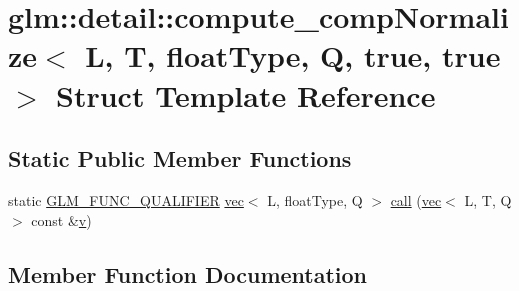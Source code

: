 \hypertarget{structglm_1_1detail_1_1compute__comp_normalize_3_01_l_00_01_t_00_01float_type_00_01_q_00_01true_00_01true_01_4}{}\section{glm\+:\+:detail\+:\+:compute\+\_\+comp\+Normalize$<$ L, T, float\+Type, Q, true, true $>$ Struct Template Reference}
\label{structglm_1_1detail_1_1compute__comp_normalize_3_01_l_00_01_t_00_01float_type_00_01_q_00_01true_00_01true_01_4}
\subsection*{Static Public Member Functions}
\begin{DoxyCompactItemize}
\item 
static \mbox{\hyperlink{setup_8hpp_a33fdea6f91c5f834105f7415e2a64407}{G\+L\+M\+\_\+\+F\+U\+N\+C\+\_\+\+Q\+U\+A\+L\+I\+F\+I\+ER}} \mbox{\hyperlink{structglm_1_1vec}{vec}}$<$ L, float\+Type, Q $>$ \mbox{\hyperlink{structglm_1_1detail_1_1compute__comp_normalize_3_01_l_00_01_t_00_01float_type_00_01_q_00_01true_00_01true_01_4_aca1253c5ce571f9aa75a98377f2f38cc}{call}} (\mbox{\hyperlink{structglm_1_1vec}{vec}}$<$ L, T, Q $>$ const \&\mbox{\hyperlink{_s_d_l__opengl_8h_a10a82eabcb59d2fcd74acee063775f90}{v}})
\end{DoxyCompactItemize}


\subsection{Member Function Documentation}
\mbox{\label{structglm_1_1detail_1_1compute__comp_normalize_3_01_l_00_01_t_00_01float_type_00_01_q_00_01true_00_01true_01_4_aca1253c5ce571f9aa75a98377f2f38cc}} 
